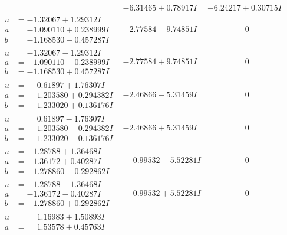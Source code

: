\documentclass[1p]{elsarticle_modified}
\theoremstyle{definition}
\begin{document}
$$\begin{array}{c|c|c}
 & -6.31465 + 0.78917 I & -6.24217 + 0.30715 I \\ \hline\begin{aligned}
u &= -1.32067 + 1.29312 I \\
a &= -1.090110 + 0.238999 I \\
b &= -1.168530 - 0.457287 I\end{aligned}
 & -2.77584 - 9.74851 I & \phantom{-0.000000 } 0 \\ \hline\begin{aligned}
u &= -1.32067 - 1.29312 I \\
a &= -1.090110 - 0.238999 I \\
b &= -1.168530 + 0.457287 I\end{aligned}
 & -2.77584 + 9.74851 I & \phantom{-0.000000 } 0 \\ \hline\begin{aligned}
u &= \phantom{-}0.61897 + 1.76307 I \\
a &= \phantom{-}1.203580 + 0.294382 I \\
b &= \phantom{-}1.233020 + 0.136176 I\end{aligned}
 & -2.46866 - 5.31459 I & \phantom{-0.000000 } 0 \\ \hline\begin{aligned}
u &= \phantom{-}0.61897 - 1.76307 I \\
a &= \phantom{-}1.203580 - 0.294382 I \\
b &= \phantom{-}1.233020 - 0.136176 I\end{aligned}
 & -2.46866 + 5.31459 I & \phantom{-0.000000 } 0 \\ \hline\begin{aligned}
u &= -1.28788 + 1.36468 I \\
a &= -1.36172 + 0.40287 I \\
b &= -1.278860 - 0.292862 I\end{aligned}
 & \phantom{-}0.99532 - 5.52281 I & \phantom{-0.000000 } 0 \\ \hline\begin{aligned}
u &= -1.28788 - 1.36468 I \\
a &= -1.36172 - 0.40287 I \\
b &= -1.278860 + 0.292862 I\end{aligned}
 & \phantom{-}0.99532 + 5.52281 I & \phantom{-0.000000 } 0 \\ \hline\begin{aligned}
u &= \phantom{-}1.16983 + 1.50893 I \\
a &= \phantom{-}1.53578 + 0.45763 I \\

\end{aligned}
\end{array}$$
\end{document}
